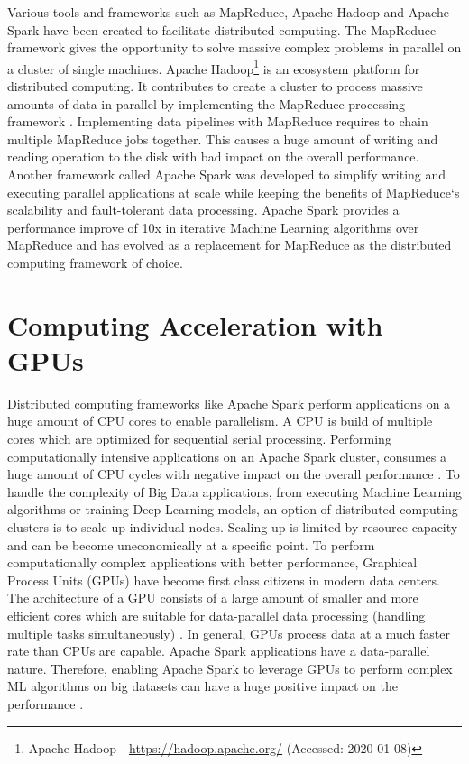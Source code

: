 Various tools and frameworks such as MapReduce, Apache Hadoop and Apache Spark have been created to facilitate distributed computing.
The MapReduce\cite{Dean2004MapReduce} framework gives the opportunity to solve massive complex problems in parallel on a cluster of single machines.
Apache Hadoop\footnote{Apache Hadoop - \url{https://hadoop.apache.org/} (Accessed: 2020-01-08)} is an ecosystem platform for distributed computing. It contributes to create a cluster to process massive amounts of data in parallel by implementing the MapReduce processing framework \cite{Khattak2016BigData}.
Implementing data pipelines with MapReduce requires to chain multiple MapReduce jobs together. This causes a huge amount of writing and reading operation to the disk with bad impact on the overall performance. Another framework called Apache Spark was developed to simplify writing and executing parallel applications at scale while keeping the benefits of MapReduce`s scalability and fault-tolerant data processing. Apache Spark provides a performance improve of 10x in iterative Machine Learning algorithms over MapReduce \cite{Zaharia2010Spark} and has evolved as a replacement for MapReduce as the distributed computing framework of choice.


\section{Computing Acceleration with GPUs}
Distributed computing frameworks like Apache Spark perform applications on a huge amount of CPU cores to enable parallelism. A CPU is build of multiple cores which are optimized for sequential serial processing. Performing computationally intensive applications on an Apache Spark cluster, consumes a huge amount of CPU cycles with negative impact on the overall performance \cite{Li2015HeteroSpark}.
To handle the complexity of Big Data applications, from executing Machine Learning algorithms or training Deep Learning models, an option of distributed computing clusters is to scale-up individual nodes. Scaling-up is limited by resource capacity and can be become uneconomically at a specific point.
To perform computationally complex applications with better performance, Graphical Process Units (GPUs) have become first class citizens in modern data centers. The architecture of a GPU consists of a large amount of smaller and more efficient cores which are suitable for data-parallel data processing (handling multiple tasks simultaneously) \cite{Yuan2016SparkGPU}. In general, GPUs process data at a much faster rate than CPUs are capable.
Apache Spark applications have a data-parallel nature. Therefore, enabling Apache Spark to leverage GPUs to perform complex ML algorithms on big datasets can have a huge positive impact on the performance \cite{Yuan2016SparkGPU}.


